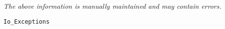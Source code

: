 \label{pkg:io\_exceptions}

{\tiny \it The above information is manually maintained and may contain errors.}
\begin{verbatim}
Io_Exceptions
\end{verbatim}
